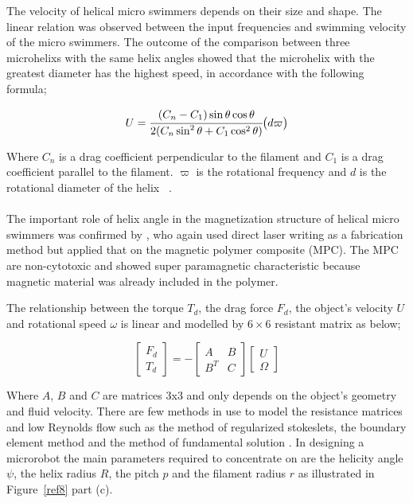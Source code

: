 \documentclass[a4paper,11pt]{article}
\begin{document}
\begin{sloppypar}
The velocity of helical micro swimmers depends on their size and shape. The linear relation was 
observed between the input frequencies and swimming velocity of the micro swimmers. The outcome of 
the comparison between three microhelixs with the same helix angles showed that the microhelix with the
 greatest diameter has the highest speed, in accordance with the following formula;

\begin{equation}
  U = {\cfrac{(C_n - C_1) \sin \theta \cos \theta}{2(C_n \sin^2 \theta + C_1 \cos^2 \theta)}} \big( d \varpi \big)
\end{equation} 

Where $C_n$ is a drag coefficient perpendicular to the filament and $C_1$ is a drag coefficient
 parallel to the filament. $ \varpi$ is the rotational frequency and $d$ is the rotational diameter of 
the helix ~\citep{tottori2012magnetic}.  



\paragraph{}
The important role of helix angle in the magnetization structure of helical micro swimmers 
was confirmed by \citeauthor{peyer2013bacteria}, who again used direct laser writing as a fabrication method but 
applied that on the magnetic polymer composite (MPC). The MPC are non-cytotoxic and showed 
super paramagnetic characteristic because magnetic material was already included in the polymer. 

The relationship between the torque $T_d$, the drag force $F_d$, the object\rq{}s velocity $U$ and rotational 
speed $\omega$ is linear and modelled by $6\times6$ resistant matrix as below;



\[
\begin{bmatrix} F_d \\ 
T_d \end{bmatrix}  =- \begin{bmatrix} A & B \\ 
B^T & C \end{bmatrix}  \begin{bmatrix} U
 \\ \Omega
\end{bmatrix}
\]




Where $A$, $B$ and $C$ are matrices 3x3 and only depends on the object\rq{}s geometry and fluid velocity. 
There are few methods in use to model the resistance matrices and low Reynolds flow such as the 
method of regularized stokeslets, the boundary element method and the method of fundamental solution
. In designing a microrobot the main parameters required to concentrate on are the helicity angle $\psi$, 
the helix radius $R$, the pitch $p$ and the filament radius $r$ as illustrated in Figure~\ref{ref8} part (c). 


\end{sloppypar}
\end{document}
